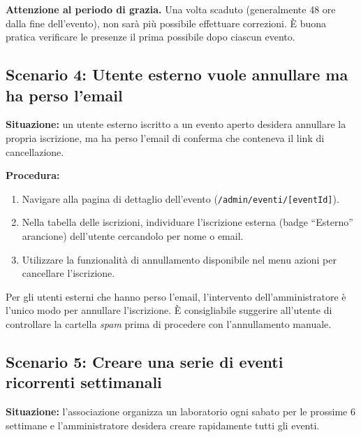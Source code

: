 \documentclass[a4paper,11pt,oneside]{book}
\newcommand{\percorso}[1]{\textcolor{namoCyan}{\texttt{#1}}}
\begin{document}
\begin{warningbox}
\textbf{Attenzione al periodo di grazia.} Una volta scaduto (generalmente 48 ore dalla fine dell'evento), non sar\`a pi\`u possibile effettuare correzioni. \`E buona pratica verificare le presenze il prima possibile dopo ciascun evento.
\end{warningbox}

\subsection{Scenario 4: Utente esterno vuole annullare ma ha perso l'email}

\textbf{Situazione:} un utente esterno iscritto a un evento aperto desidera annullare la propria iscrizione, ma ha perso l'email di conferma che conteneva il link di cancellazione.

\textbf{Procedura:}
\begin{enumerate}[leftmargin=1.5em]
  \item Navigare alla pagina di dettaglio dell'evento (\percorso{/admin/eventi/[eventId]}).
  \item Nella tabella delle iscrizioni, individuare l'iscrizione esterna (badge ``Esterno'' arancione) dell'utente cercandolo per nome o email.
  \item Utilizzare la funzionalit\`a di annullamento disponibile nel menu azioni per cancellare l'iscrizione.
\end{enumerate}

\begin{tipbox}
Per gli utenti esterni che hanno perso l'email, l'intervento dell'amministratore \`e l'unico modo per annullare l'iscrizione. \`E consigliabile suggerire all'utente di controllare la cartella \textit{spam} prima di procedere con l'annullamento manuale.
\end{tipbox}

\subsection{Scenario 5: Creare una serie di eventi ricorrenti settimanali}

\textbf{Situazione:} l'associazione organizza un laboratorio ogni sabato per le prossime 6 settimane e l'amministratore desidera creare rapidamente tutti gli eventi.
\end{document}
